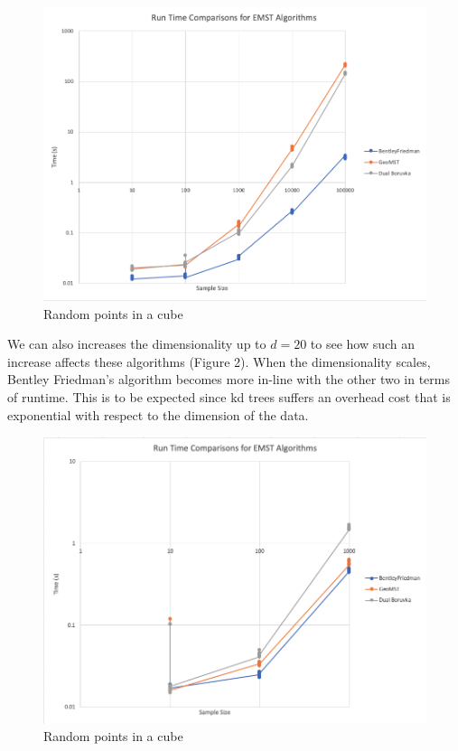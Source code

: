 \documentclass[11pt]{article}
\begin{document}
\begin{figure}
	\begin{center}
		\includegraphics[width=\textwidth]{data.png}
	\end{center}
	\caption{Random points in a cube}
\end{figure}

We can also increases the dimensionality up to $d=20$ to see how such an increase affects these algorithms (Figure 2). When the dimensionality scales, Bentley Friedman's algorithm becomes more in-line with the other two in terms of runtime. This is to be expected since kd trees suffers an overhead cost that is exponential with respect to the dimension of the data.

\begin{figure}
	\begin{center}
		\includegraphics[width=\textwidth]{data2.png}
	\end{center}
	\caption{Random points in a cube}
\end{figure}
\end{document}
